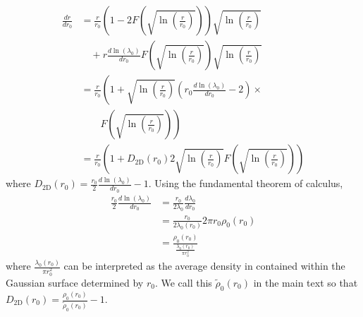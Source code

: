 \documentclass[aps,prl,twocolumn,showpacs,superscriptaddress,groupedaddress]{revtex4-1}  %
\begin{document}
\begin{align}
  \frac{d r}{d r_0} &= \frac{r}{r_0} \left(1 - 2 F\left(\sqrt{\ln \left(\frac{r}{r_0}\right)}\right)\right)\sqrt{\ln \left(\frac{r}{r_0}\right)}\nonumber\\
                           &\quad +  r \frac{d\ln(\lambda_0)}{d r_0} F\left(\sqrt{\ln \left(\frac{r}{r_0}\right)}\right)\sqrt{\ln \left(\frac{r}{r_0}\right)}\nonumber\\
                           &= \frac{r}{r_0} \left(1 + \sqrt{\ln \left(\frac{r}{r_0}\right)} \left( r_0 \frac{d\ln(\lambda_0)}{d r_0} - 2 \right )\times\right.\nonumber\\
                           &\quad\quad \left.F\left(\sqrt{\ln \left(\frac{r}{r_0}\right)}\right)\right)\nonumber\\
                           &= \frac{r}{r_0} \left(1 + D_\text{2D}(r_0) 2 \sqrt{\ln \left(\frac{r}{r_0}\right)} F\left(\sqrt{\ln \left(\frac{r}{r_0}\right)}\right)\right)
\end{align}
where $D_\text{2D}(r_0) = \frac{r_0}{2} \frac{d\ln(\lambda_0)}{d r_0} - 1$.  Using the fundamental theorem of calculus,
\begin{align}
  \frac{r_0}{2} \frac{d\ln(\lambda_0)}{d r_0} &= \frac{r_0}{2 \lambda_0}\frac{d\lambda_0}{d r_0} \nonumber\\ 
                                                                    &= \frac{r_0}{2 \lambda_0(r_0)} 2 \pi r_0 \rho_0(r_0)\nonumber\\
                                                                    &= \frac{\rho_0(r_0)}{\frac{\lambda_0(r_0)}{\pi r_0^2}} 
\end{align}
where $\frac{\lambda_0(r_0)}{\pi r_0^2}$ can be interpreted as the average density in contained within the Gaussian surface determined by $r_0$.  We call this 
$\tilde{\rho}_0(r_0)$ in the main text so that $D_\text{2D}(r_0) = \frac{\rho_0(r_0)}{\tilde{\rho}_0(r_0)} -1$.
\end{document}
